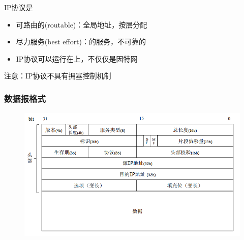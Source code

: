 \myhline
IP协议是
\begin{itemize}
\item 可路由的(routable)：全局地址，按层分配
\item 尽力服务(best effort)：的服务，不可靠的
\item IP协议可以运行在上，不仅仅是因特网
\end{itemize}
注意：IP协议不具有拥塞控制机制

\subsubsection{数据报格式}
\begin{figure}[H]
	\centering
	\includegraphics[width=0.7\linewidth]{fig/IP_datagram.png}
\end{figure}

